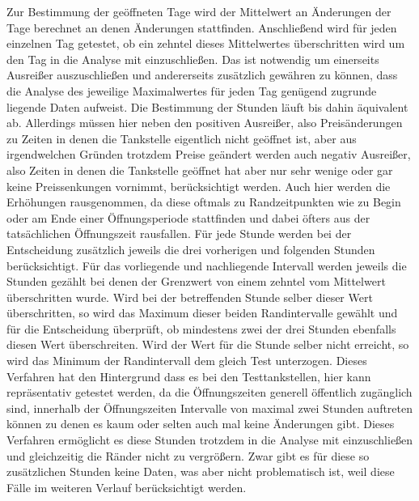 \documentclass[12pt,a4paper,bibliography=totocnumbered,listof=totocnumbered]{scrartcl}
\begin{document}
Zur Bestimmung der geöffneten Tage wird der Mittelwert an Änderungen der Tage berechnet an denen Änderungen stattfinden. Anschließend wird für jeden einzelnen Tag getestet, ob ein zehntel dieses Mittelwertes überschritten wird um den Tag in die Analyse mit einzuschließen. Das ist notwendig um einerseits Ausreißer auszuschließen und andererseits zusätzlich gewähren zu können, dass die Analyse des jeweilige Maximalwertes für jeden Tag genügend zugrunde liegende Daten aufweist. Die Bestimmung der Stunden läuft bis dahin äquivalent ab. Allerdings müssen hier neben den positiven Ausreißer, also Preisänderungen zu Zeiten in denen die Tankstelle eigentlich nicht geöffnet ist, aber aus irgendwelchen Gründen trotzdem Preise geändert werden auch negativ Ausreißer, also Zeiten in denen die Tankstelle geöffnet hat aber nur sehr wenige oder gar keine Preissenkungen vornimmt, berücksichtigt werden. Auch hier werden die Erhöhungen rausgenommen, da diese oftmals zu Randzeitpunkten wie zu Begin oder am Ende einer Öffnungsperiode stattfinden und dabei öfters aus der tatsächlichen Öffnungszeit rausfallen. Für jede Stunde werden bei der Entscheidung zusätzlich jeweils die drei vorherigen und folgenden Stunden berücksichtigt. Für das vorliegende und nachliegende Intervall werden jeweils die Stunden gezählt bei denen der Grenzwert von einem zehntel vom Mittelwert überschritten wurde. Wird bei der betreffenden Stunde selber dieser Wert überschritten, so wird das Maximum dieser beiden Randintervalle gewählt und für die Entscheidung überprüft, ob mindestens zwei der drei Stunden ebenfalls diesen Wert überschreiten. Wird der Wert für die Stunde selber nicht erreicht, so wird das Minimum der Randintervall dem gleich Test unterzogen. Dieses Verfahren hat den Hintergrund dass es bei den Testtankstellen, hier kann repräsentativ getestet werden, da die Öffnungszeiten generell öffentlich zugänglich sind, innerhalb der Öffnungszeiten Intervalle von maximal zwei Stunden auftreten können zu denen es kaum oder selten auch mal keine Änderungen gibt. Dieses Verfahren ermöglicht es diese Stunden trotzdem in die Analyse mit einzuschließen und gleichzeitig die Ränder nicht zu vergrößern. Zwar gibt es für diese so zusätzlichen Stunden keine Daten, was aber nicht problematisch ist, weil diese Fälle im weiteren Verlauf berücksichtigt werden.\\
\end{document}
